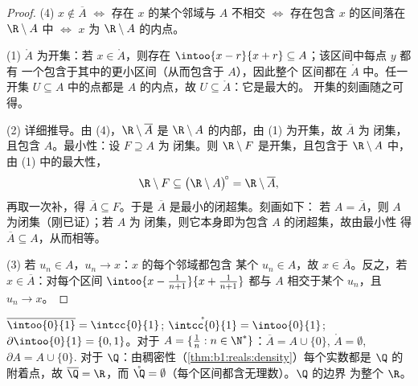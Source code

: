 \begin{proof}
(4) $x \notin \overline A$ $\iff$ 存在 $x$ 的某个邻域与 $A$ 不相交
$\iff$ 存在包含 $x$ 的区间落在 $\R \setminus A$ 中 $\iff$ $x$
为 $\R \setminus A$ 的内点。

(1) $\mathring A$ 为开集：若 $x \in \mathring A$，则存在
$\intoo{x-r}{x+r} \subseteq A$；该区间中每点 $y$ 都有
一个包含于其中的更小区间（从而包含于 $A$），因此整个
区间都在 $\mathring A$ 中。任一开集 $U \subseteq A$ 中的点都是
$A$ 的内点，故 $U \subseteq \mathring A$：它是最大的。
开集的刻画随之可得。

(2) 详细推导。由 (4)，$\R \setminus \overline A$ 是
$\R \setminus A$ 的内部，由 (1) 为开集，故 $\overline A$ 为
闭集，且包含 $A$。最小性：设 $F \supseteq A$ 为
闭集。则 $\R \setminus F$ 是开集，且包含于 $\R
\setminus A$ 中，由 (1) 中的最大性，
\[
\R \setminus F \subseteq \bigl(\R \setminus A\bigr)^{\!\circ}
= \R \setminus \overline A ,
\]
再取一次补，得 $\overline A \subseteq F$。于是
$\overline A$ 是最小的闭超集。刻画如下：
若 $A = \overline A$，则 $A$ 为闭集（刚已证）；若 $A$ 为
闭集，则它本身即为包含 $A$ 的闭超集，故由最小性
得 $\overline A \subseteq A$，从而相等。

(3) 若 $u_n \in A$，$u_n \to x$：$x$ 的每个邻域都包含
某个 $u_n \in A$，故 $x \in \overline A$。反之，若 $x \in
\overline A$：对每个区间 $\intoo{x - \frac{1}{n+1}}{x +
\frac{1}{n+1}}$ 都与 $A$ 相交于某个 $u_n$，且 $u_n \to x$。
\end{proof}

\begin{example}\label{ex:b1:topology:closureexamples}
$\overline{\intoo{0}{1}} = \intcc{0}{1}$;
$\mathring{\intcc{0}{1}} = \intoo{0}{1}$; $\partial\intoo{0}{1} =
\{0, 1\}$。对于 $A = \{\frac 1n : n \in \N^*\}$：$\overline A = A
\cup \{0\}$, $\mathring A = \emptyset$, $\partial A = A \cup \{0\}$.
对于 $\Q$：由稠密性（\cref{thm:b1:reals:density}）每个实数都是
$\Q$ 的附着点，故 $\overline{\Q} = \R$，而 $\mathring{\Q} =
\emptyset$（每个区间都含无理数）。$\Q$ 的边界
为整个 $\R$。
\end{example}

